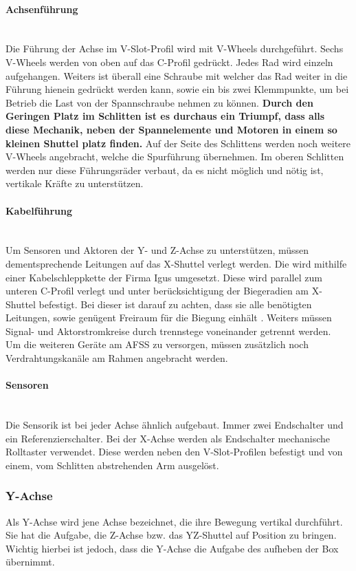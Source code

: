 \paragraph{Achsenführung} \mbox{}\\
Die Führung der Achse im V-Slot-Profil wird mit V-Wheels durchgeführt. Sechs V-Wheels werden von oben auf das C-Profil gedrückt. Jedes Rad wird einzeln aufgehangen. Weiters ist überall eine Schraube mit welcher das Rad weiter in die Führung hienein gedrückt werden kann, sowie ein bis zwei Klemmpunkte, um bei Betrieb die Last von der Spannschraube nehmen zu können. \textbf{Durch den Geringen Platz im Schlitten ist es durchaus ein Triumpf, dass alls diese Mechanik, neben der Spannelemente und Motoren in einem so kleinen Shuttel platz finden.} Auf der Seite des Schlittens werden noch weitere V-Wheels angebracht, welche die Spurführung übernehmen.
Im oberen Schlitten werden nur diese Führungsräder verbaut, da es nicht möglich und nötig ist, vertikale Kräfte zu unterstützen.

\paragraph{Kabelführung} \mbox{}\\
Um Sensoren und Aktoren der Y- und Z-Achse zu unterstützen, müssen dementsprechende Leitungen auf das X-Shuttel verlegt werden. Die wird mithilfe einer Kabelschleppkette der Firma Igus umgesetzt. Diese wird parallel zum unteren C-Profil verlegt und unter berücksichtigung der Biegeradien am X-Shuttel befestigt. Bei dieser ist darauf zu achten, dass sie alle benötigten Leitungen, sowie genügent Freiraum für die Biegung einhält \cite{igus_freitragend}. Weiters müssen Signal- und Aktorstromkreise durch trennstege voneinander getrennt werden.\\
Um die weiteren Geräte am AFSS zu versorgen, müssen zusätzlich noch Verdrahtungskanäle am Rahmen angebracht werden. 

\paragraph{Sensoren}\mbox{}\\
Die Sensorik ist bei jeder Achse ähnlich aufgebaut. Immer zwei Endschalter und ein Referenzierschalter. Bei der X-Achse werden als Endschalter mechanische Rolltaster verwendet. Diese werden neben den V-Slot-Profilen befestigt und von einem, vom Schlitten abstrehenden Arm ausgelöst. 

\subsubsection{Y-Achse}
Als Y-Achse wird jene Achse bezeichnet, die ihre Bewegung vertikal durchführt. Sie hat die Aufgabe, die Z-Achse bzw. das YZ-Shuttel auf Position zu bringen. Wichtig hierbei ist jedoch, dass die Y-Achse die Aufgabe des aufheben der Box übernimmt.

